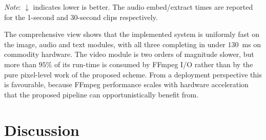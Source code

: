 \begin{table}[H]
    \captionsetup{justification=centering}
    \caption{Comprehensive performance comparison of all four modules in the proposed framework.}
    \label{tab:comprehensive}
    \centering
\end{table}

\noindent\textit{Note}: $\downarrow$ indicates lower is better. The audio embed/extract times are reported for the 1-second and 30-second clips respectively.

The comprehensive view shows that the implemented system is uniformly fast on the image, audio and text modules, with all three completing in under $130$~ms on commodity hardware. The video module is two orders of magnitude slower, but more than $95\%$ of its run-time is consumed by FFmpeg I/O rather than by the pure pixel-level work of the proposed scheme. From a deployment perspective this is favourable, because FFmpeg performance scales with hardware acceleration that the proposed pipeline can opportunistically benefit from.

\section{Discussion}
\label{sec:discussion}

